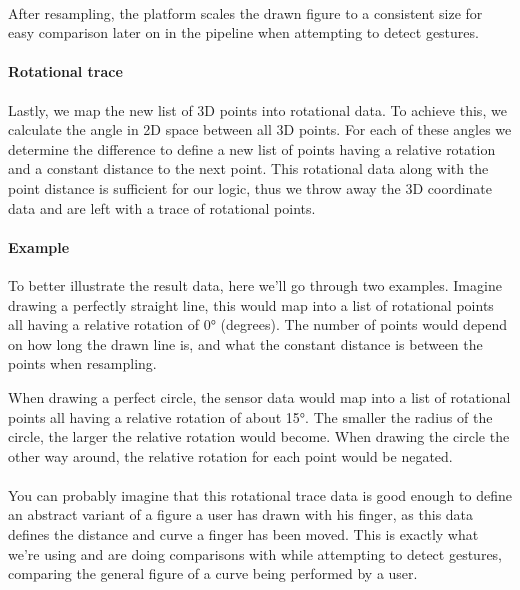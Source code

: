 \documentclass{standalone}
\begin{document}
  \paragraph{}
  After resampling, the platform scales the drawn figure to a consistent size
  for easy comparison later on in the pipeline when attempting to detect
  gestures.

  \paragraph{Rotational trace}
  Lastly, we map the new list of 3D points into rotational data. To achieve
  this, we calculate the angle in 2D space between all 3D points. For each of
  these angles we determine the difference to define a new list of points having
  a relative rotation and a constant distance to the next point.
  This rotational data along with the point distance is sufficient for our logic,
  thus we throw away the 3D coordinate data and are left with a trace of
  rotational points.

  \paragraph{Example}
  To better illustrate the result data, here we'll go through two examples.
  Imagine drawing a perfectly straight line, this would map into a list of
  rotational points all having a relative rotation of 0\si{\degree} (degrees).
  The number of points would depend on how long the drawn line is, and what the
  constant distance is between the points when resampling.

  When drawing a perfect circle, the sensor data would map into a list of
  rotational points all having a relative rotation of about 15\si{\degree}. The
  smaller the radius of the circle, the larger the relative rotation would
  become. When drawing the circle the other way around, the relative rotation
  for each point would be negated.

  \paragraph{}
  You can probably imagine that this rotational trace data is good enough to
  define an abstract variant of a figure a user has drawn with his
  finger, as this data defines the distance and curve a finger has been moved.
  This is exactly what we're using and are doing comparisons with while
  attempting to detect gestures, comparing the general figure of a curve being
  performed by a user.
\end{document}
